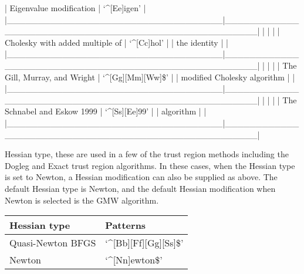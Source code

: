 | Eigenvalue modification           | `\^{}[Ee]igen'                                         |
|\_\_\_\_\_\_\_\_\_\_\_\_\_\_\_\_\_\_\_\_\_\_\_\_\_\_\_\_\_\_\_\_\_\_\_|\_\_\_\_\_\_\_\_\_\_\_\_\_\_\_\_\_\_\_\_\_\_\_\_\_\_\_\_\_\_\_\_\_\_\_\_\_\_\_\_\_\_\_\_\_\_\_\_\_\_\_\_\_|
|                                   |                                                     |
| Cholesky with added multiple of   | `\^{}[Cc]hol'                                          |
| the identity                      |                                                     |
|\_\_\_\_\_\_\_\_\_\_\_\_\_\_\_\_\_\_\_\_\_\_\_\_\_\_\_\_\_\_\_\_\_\_\_|\_\_\_\_\_\_\_\_\_\_\_\_\_\_\_\_\_\_\_\_\_\_\_\_\_\_\_\_\_\_\_\_\_\_\_\_\_\_\_\_\_\_\_\_\_\_\_\_\_\_\_\_\_|
|                                   |                                                     |
| The Gill, Murray, and Wright      | `\^{}[Gg][Mm][Ww]\$'                                    |
| modified Cholesky algorithm       |                                                     |
|\_\_\_\_\_\_\_\_\_\_\_\_\_\_\_\_\_\_\_\_\_\_\_\_\_\_\_\_\_\_\_\_\_\_\_|\_\_\_\_\_\_\_\_\_\_\_\_\_\_\_\_\_\_\_\_\_\_\_\_\_\_\_\_\_\_\_\_\_\_\_\_\_\_\_\_\_\_\_\_\_\_\_\_\_\_\_\_\_|
|                                   |                                                     |
| The Schnabel and Eskow 1999       | `\^{}[Ss][Ee]99'                                       |
| algorithm                         |                                                     |
|\_\_\_\_\_\_\_\_\_\_\_\_\_\_\_\_\_\_\_\_\_\_\_\_\_\_\_\_\_\_\_\_\_\_\_|\_\_\_\_\_\_\_\_\_\_\_\_\_\_\_\_\_\_\_\_\_\_\_\_\_\_\_\_\_\_\_\_\_\_\_\_\_\_\_\_\_\_\_\_\_\_\_\_\_\_\_\_\_|



Hessian type, these are used in a few of the trust region methods including the Dogleg and Exact
trust region algorithms.  In these cases, when the Hessian type is set to Newton, a Hessian
modification can also be supplied as above.  The default Hessian type is Newton, and the default
Hessian modification when Newton is selected is the GMW algorithm.


\begin{center}
\begin{tabular}{ll}
\toprule
Hessian type & Patterns \\
\midrule
 Quasi-Newton BFGS                  &  `\^{}[Bb][Ff][Gg][Ss]\$'                                 \\
 Newton                             &  `\^{}[Nn]ewton\$'                                        \\
\bottomrule
\end{tabular}
\end{center}


